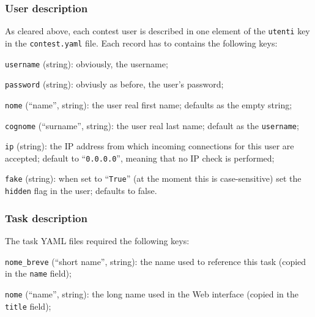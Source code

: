 \documentclass[a4paper,8pt]{amsart}
\newenvironment{squishlist}{%
  \begin{list}{\textbullet}%
    { \setlength{\itemsep}{0pt}%
      \setlength{\parsep}{3pt}%
      \setlength{\topsep}{3pt}%
      \setlength{\partopsep}{0pt}%
      \setlength{\leftmargin}{1.5em}%
      \setlength{\labelwidth}{1em}%
      \setlength{\labelsep}{0.5em} }%
}{\end{list}}
\newcommand{\id}[1]{\texttt{#1}}
\newcommand{\file}[1]{\texttt{#1}}
\begin{document}
\begin{multicols}{2}
  \subsubsection{User description}

  As cleared above, each contest user is described in one element of
  the \id{utenti} key in the \file{contest.yaml} file. Each record has
  to contains the following keys:

  \begin{squishlist}

  \item \id{username} (string): obviously, the username;

  \item \id{password} (string): obviusly as before, the user's
    password;

  \item \id{nome} (``name'', string): the user real first name;
    defaults as the empty string;

  \item \id{cognome} (``surname'', string): the user real last name;
    default as the \id{username};

  \item \id{ip} (string): the IP address from which incoming
    connections for this user are accepted; default to
    ``\id{0.0.0.0}'', meaning that no IP check is performed;

  \item \id{fake} (string): when set to ``\id{True}'' (at the moment
    this is case-sensitive) set the \id{hidden} flag in the
    user; defaults to false.

  \end{squishlist}

  \subsubsection{Task description}

  The task YAML files required the following keys:

  \begin{squishlist}

  \item \id{nome\_breve} (``short name'', string): the name used to
    reference this task (copied in the \id{name} field);

  \item \id{nome} (``name'', string): the long name used in the Web
    interface (copied in the \id{title} field);


\end{squishlist}
\end{multicols}
\end{document}
